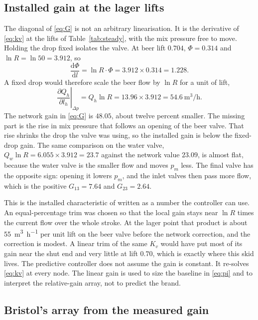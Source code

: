 \subsection{Installed gain at the lager lifts}
\label{sec:installed}

The diagonal of \eqref{eq:G} is not an arbitrary linearisation. It is the derivative of \eqref{eq:kv} at the lifts of Table~\ref{tab:steady}, with the mix pressure free to move. Holding the drop fixed isolates the valve. At beer lift $0.704$, $\Phi=0.314$ and $\ln R=\ln 50=3.912$, so
\begin{equation}
\label{eq:dphi}
\frac{\mathrm{d}\Phi}{\mathrm{d}l}
=
\ln R\cdot\Phi
=
3.912\times 0.314
=
1.228.
\end{equation}
A fixed drop would therefore scale the beer flow by $\ln R$ for a unit of lift,
\begin{equation}
\left.\frac{\partial Q_h}{\partial l_h}\right|_{\Delta p}
=
Q_h\ln R
=
13.96\times 3.912
=
\SI{54.6}{\cubic\metre\per\hour}.
\end{equation}
The network gain in \eqref{eq:G} is $48.05$, about twelve percent smaller. The missing part is the rise in mix pressure that follows an opening of the beer valve. That rise shrinks the drop the valve was using, so the installed gain is below the fixed-drop gain. The same comparison on the water valve, $Q_w\ln R = 6.055\times 3.912 = 23.7$ against the network value $23.09$, is almost flat, because the water valve is the smaller flow and moves $p_m$ less. The final valve has the opposite sign: opening it lowers $p_m$, and the inlet valves then pass more flow, which is the positive $G_{13}=7.64$ and $G_{23}=2.64$.

This is the installed characteristic of \citet{iec60534,fisher2005} written as a number the controller can use. An equal-percentage trim was chosen so that the local gain stays near $\ln R$ times the current flow over the whole stroke. At the lager point that product is about \SI{55}{\cubic\metre\per\hour} per unit lift on the beer valve before the network correction, and the correction is modest. A linear trim of the same $K_v$ would have put most of its gain near the shut end and very little at lift $0.70$, which is exactly where this skid lives. The predictive controller does not assume the gain is constant. It re-solves \eqref{eq:kv} at every node. The linear gain is used to size the baseline in \eqref{eq:pi} and to interpret the relative-gain array, not to predict the brand.

\subsection{Bristol's array from the measured gain}
\label{sec:bristol}

